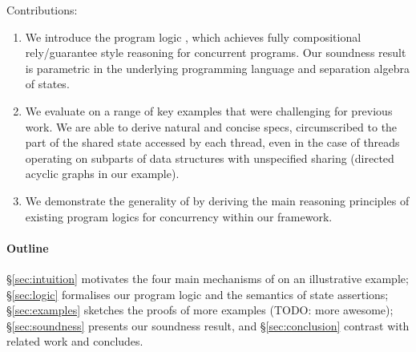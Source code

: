 Contributions:
\begin{enumerate}
\item
  We introduce the program logic \colosl, which achieves fully
  compositional rely/guarantee style reasoning for concurrent
  programs. Our soundness result is parametric in the underlying
  programming language and separation algebra of states.
\item
  We evaluate \colosl on a range of key examples that were challenging
  for previous work. We are able to derive natural and concise specs,
  circumscribed to the part of the shared state accessed by each
  thread, even in the case of threads operating on subparts of data
  structures with unspecified sharing (directed acyclic graphs in our
  example).
\item
  We demonstrate the generality of \colosl by deriving the main
  reasoning principles of existing program logics for concurrency
  within our framework.
\end{enumerate}

\paragraph{Outline}
\S\ref{sec:intuition} motivates the four main mechanisms of \colosl on
an illustrative example; \S\ref{sec:logic} formalises our program
logic and the semantics of state assertions; \S\ref{sec:examples}
sketches the proofs of more examples (TODO: more awesome);
\S\ref{sec:soundness} presents our soundness result, and
\S\ref{sec:conclusion} contrast with related work and concludes.
